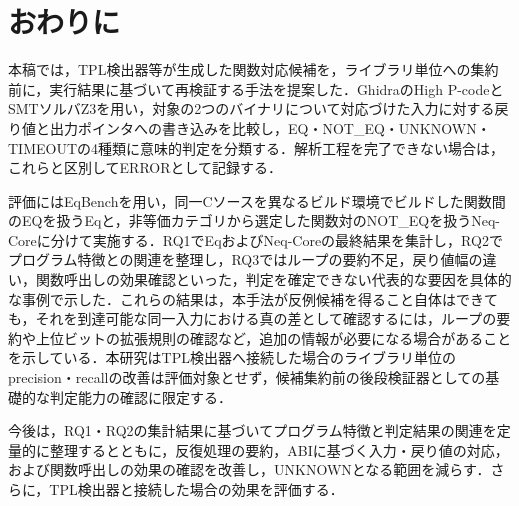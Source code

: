 \section{おわりに}

本稿では，TPL検出器等が生成した関数対応候補を，ライブラリ単位への集約前に，実行結果に基づいて再検証する手法を提案した．GhidraのHigh P-codeとSMTソルバZ3を用い，対象の2つのバイナリについて対応づけた入力に対する戻り値と出力ポインタへの書き込みを比較し，EQ・NOT\_EQ・UNKNOWN・TIMEOUTの4種類に意味的判定を分類する．解析工程を完了できない場合は，これらと区別してERRORとして記録する．

評価にはEqBenchを用い，同一Cソースを異なるビルド環境でビルドした関数間のEQを扱うEqと，非等価カテゴリから選定した関数対のNOT\_EQを扱うNeq-Coreに分けて実施する．RQ1でEqおよびNeq-Coreの最終結果を集計し，RQ2でプログラム特徴との関連を整理し，RQ3ではループの要約不足，戻り値幅の違い，関数呼出しの効果確認といった，判定を確定できない代表的な要因を具体的な事例で示した．これらの結果は，本手法が反例候補を得ること自体はできても，それを到達可能な同一入力における真の差として確認するには，ループの要約や上位ビットの拡張規則の確認など，追加の情報が必要になる場合があることを示している．本研究はTPL検出器へ接続した場合のライブラリ単位のprecision・recallの改善は評価対象とせず，候補集約前の後段検証器としての基礎的な判定能力の確認に限定する．

今後は，RQ1・RQ2の集計結果に基づいてプログラム特徴と判定結果の関連を定量的に整理するとともに，反復処理の要約，ABIに基づく入力・戻り値の対応，および関数呼出しの効果の確認を改善し，UNKNOWNとなる範囲を減らす．さらに，TPL検出器と接続した場合の効果を評価する．
